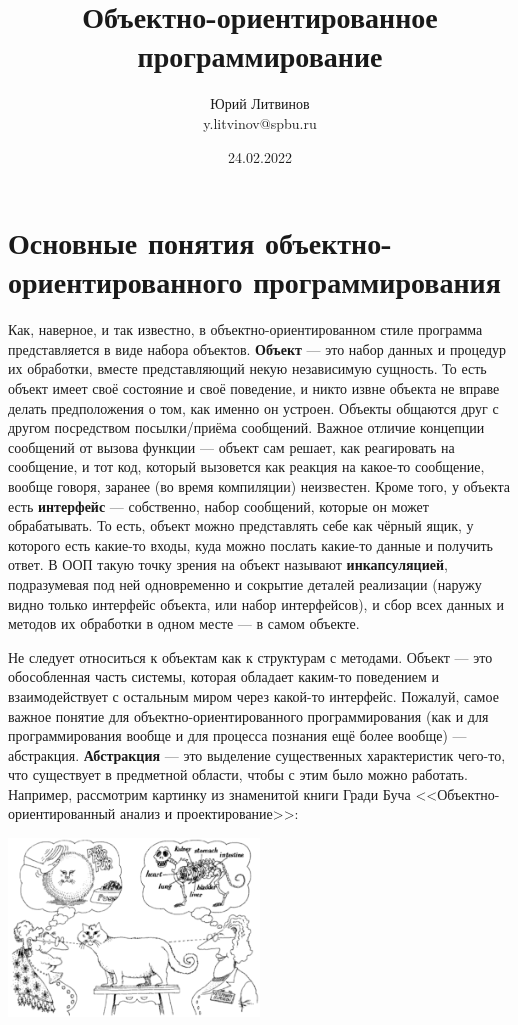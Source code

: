 \documentclass[a5paper]{article}
\title{Объектно-ориентированное программирование}
\author{Юрий Литвинов\\\small{y.litvinov@spbu.ru}}
\date{24.02.2022}
\begin{document}
\maketitle
\thispagestyle{empty}

\section{Основные понятия объектно-ориентированного программирования}

Как, наверное, и так известно, в объектно-ориентированном стиле программа представляется в виде набора объектов. \textbf{Объект} --- это набор данных и процедур их обработки, вместе представляющий некую независимую сущность. То есть объект имеет своё состояние и своё поведение, и никто извне объекта не вправе делать предположения о том, как именно он устроен. Объекты общаются друг с другом посредством посылки/приёма сообщений. Важное отличие концепции сообщений от вызова функции --- объект сам решает, как реагировать на сообщение, и тот код, который вызовется как реакция на какое-то сообщение, вообще говоря, заранее (во время компиляции) неизвестен. Кроме того, у объекта есть \textbf{интерфейс} --- собственно, набор сообщений, которые он может обрабатывать. То есть, объект можно представлять себе как чёрный ящик, у которого есть какие-то входы, куда можно послать какие-то данные и получить ответ. В ООП такую точку зрения на объект называют \textbf{инкапсуляцией}, подразумевая под ней одновременно и сокрытие деталей реализации (наружу видно только интерфейс объекта, или набор интерфейсов), и сбор всех данных и методов их обработки в одном месте --- в самом объекте.

Не следует относиться к объектам как к структурам с методами. Объект --- это обособленная часть системы, которая обладает каким-то поведением и взаимодействует с остальным миром через какой-то интерфейс. Пожалуй, самое важное понятие для объектно-ориентированного программирования (как и для программирования вообще и для процесса познания ещё более вообще) --- абстракция. \textbf{Абстракция} --- это выделение существенных характеристик чего-то, что существует в предметной области, чтобы с этим было можно работать. Например, рассмотрим картинку из знаменитой книги Гради Буча <<Объектно-ориентированный анализ и проектирование>>:

\begin{center}
    \includegraphics[width=0.5\textwidth]{abstraction.png}
\end{center}
\end{document}
